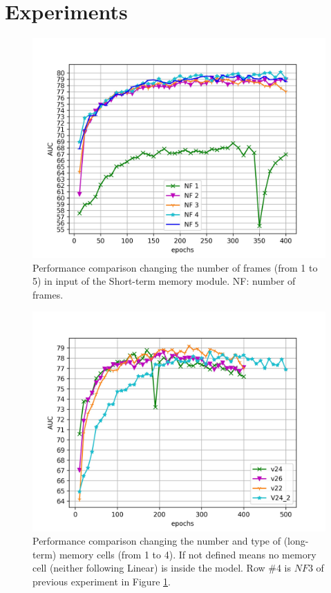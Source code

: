 \section{Experiments}
\label{sec:experiments}

\begin{figure}[t]
\centering
	\includegraphics[trim=0 0 0 0, clip, width=1.\linewidth]{images/exp_1.jpg}
	\caption{Performance comparison changing the number of frames (from 1 to 5) in input of the Short-term memory module. NF: number of frames. }
	\label{fig:num-frames-vst}
\end{figure}

\begin{figure}[t]
\centering
	\includegraphics[trim=0 0 0 0, clip, width=1.\linewidth]{images/exp_2.jpg}
	\caption{Performance comparison changing the number and type of (long-term) memory cells (from 1 to 4). If not defined means no memory cell (neither following Linear) is inside the model. Row \#4 is $NF 3$ of previous experiment in Figure \ref{fig:num-frames-vst}.}
	\label{fig:num-memory-cells}
\end{figure}

